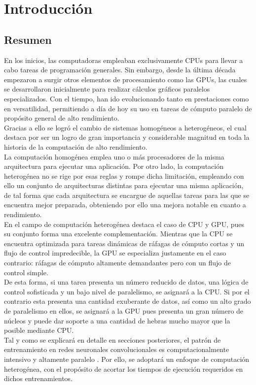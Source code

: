 \chapter{Introducción}

\section{Resumen}
En los inicios, las computadoras empleaban exclusivamente CPUs para llevar a cabo tareas de programación generales. Sin embargo, desde la última década empezaron a surgir otros elementos de procesamiento como las GPUs, las cuales se desarrollaron inicialmente para realizar cálculos gráficos paralelos especializados. Con el tiempo, han ido evolucionando tanto en prestaciones como en versatilidad, permitiendo a día de hoy su uso en tareas de cómputo paralelo de propósito general de alto rendimiento. \\
Gracias a ello se logró el cambio de sistemas homogéneos a heterogéneos, el cual destaca por ser un logro de gran importancia y considerable magnitud en toda la historia de la computación de alto rendimiento. \\
La computación homogénea emplea uno o más procesadores de la misma arquitectura para ejecutar una aplicación. Por otro lado, la computación heterogénea no se rige por esas reglas y rompe dicha limitación, empleando con ello un conjunto de arquitecturas distintas para ejecutar una misma aplicación, de tal forma que cada arquitectura se encargue de aquellas tareas para las que se encuentra mejor preparada, obteniendo por ello una mejora notable en cuanto a rendimiento. \\
En el campo de computación heterogénea destaca el caso de CPU y GPU, pues su conjunto forma una excelente complementación. Mientras que la CPU se encuentra optimizada para tareas dinámicas de ráfagas de cómputo cortas y un flujo de control impredecible, la GPU se especializa justamente en el caso contrario: ráfagas de cómputo altamente demandantes pero con un flujo de control simple. \\
De esta forma, si una tarea presenta un número reducido de datos, una lógica de control sofisticada y un bajo nivel de paralelismo, se asignará a la CPU. Si por el contrario esta presenta una cantidad exuberante de datos, así como un alto grado de paralelismo en ellos, se asignará a la GPU pues presenta un gran número de núcleos y puede dar soporte a una cantidad de hebras mucho mayor que la posible mediante CPU. \cite{Professional_CUDA_C} \\
Tal y como se explicará en detalle en secciones posteriores, el patrón de entrenamiento en redes neuronales convolucionales es computacionalmente intensivo y altamente paralelo \cite{Programming_Massively}. Por ello, se adoptará un enfoque de computación heterogénea, con el propósito de acortar los tiempos de ejecución requeridos en dichos entrenamientos.


